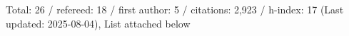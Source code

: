 Total: 26 / refereed: 18 / first author: 5 / citations: 2,923 / h-index: 17 (Last updated: 2025-08-04), List attached below